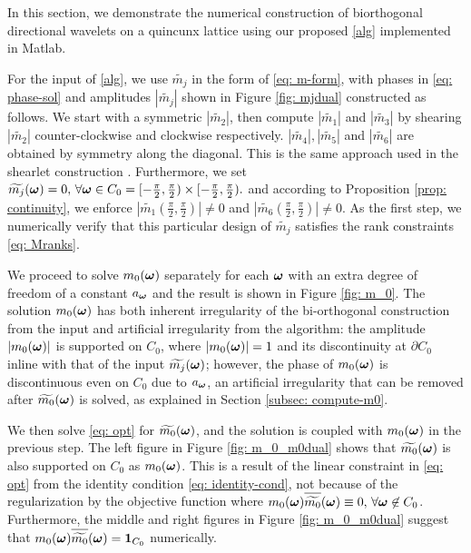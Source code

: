 In this section, we demonstrate the numerical construction of biorthogonal directional wavelets on a quincunx lattice using our proposed \ref{alg} implemented in Matlab.

For the input of \ref{alg}, we use $\widetilde{m_j}$ in the form of \eqref{eq: m-form}, with phases in \eqref{eq: phase-sol} and amplitudes $|\widetilde{m_j}|$ shown in Figure \ref{fig: mjdual} constructed as follows. We start with a symmetric $|\widetilde{m_2}|$, then compute $|\widetilde{m_1}|$ and $|\widetilde{m_3}|$ by shearing $|\widetilde{m_2}|$ counter-clockwise and clockwise respectively. $|\widetilde{m_4}|, |\widetilde{m_5}|$ and $|\widetilde{m_6}|$ are obtained by symmetry along the diagonal. This is the same approach used in the shearlet construction \cite{kutyniok2012digital}. Furthermore, we set $\widetilde{m_{j}}(\boldsymbol{\omega}) = 0,\,\forall \boldsymbol{\omega}\in C_0 = [-\frac{\pi}{2},\frac{\pi}{2})\times [-\frac{\pi}{2},\frac{\pi}{2}).$ and according to Proposition \ref{prop: continuity}, we enforce $|\widetilde{m_1}(\frac{\pi}{2},\frac{\pi}{2})|\neq 0$ and $|\widetilde{m_6}(\frac{\pi}{2},\frac{\pi}{2})|\neq 0$. As the first step, we numerically verify that this particular design of $\widetilde{m_j}$ satisfies the rank constraints \eqref{eq: Mranks}. 

We proceed to solve $m_0(\boldsymbol{\omega})$ separately for each $\boldsymbol{\omega}$ with an extra degree of freedom of a constant $a_{\boldsymbol{\omega}}$ and the result is shown in Figure \ref{fig: m_0}. The solution $m_0(\boldsymbol{\omega})$ has both inherent irregularity of the bi-orthogonal construction from the input and artificial irregularity from the algorithm: the amplitude $|m_0(\boldsymbol{\omega})|$ is supported on $C_0$, where $|m_0(\boldsymbol{\omega})| = 1$ and its discontinuity at $\partial C_0$ inline with that of the input $\widetilde{m_{j}}(\boldsymbol{\omega})$; however, the phase of $m_0(\boldsymbol{\omega})$ is discontinuous even on $C_0$ due to $a_{\boldsymbol{\omega}}$, an artificial irregularity that can be removed after $\widetilde{m_{0}}(\boldsymbol{\omega})$ is solved, as explained in Section \ref{subsec: compute-m0}.

We then solve \eqref{eq: opt} for $\widetilde{m_{0}}(\boldsymbol{\omega})$, and the solution is coupled with $m_0(\boldsymbol{\omega})$ in the previous step. The left figure in Figure \ref{fig: m_0_m0dual} shows that $\widetilde{m_{0}}(\boldsymbol{\omega})$ is also supported on $C_0$ as $m_0(\boldsymbol{\omega})$. This is a result of the linear constraint in \eqref{eq: opt} from the identity condition \eqref{eq: identity-cond}, not because of the regularization by the objective function where $m_0(\V{\omega})\sbarm{0}\equiv 0,\, \forall\V{\omega}\not\in C_0$. Furthermore, the middle and right figures in Figure \ref{fig: m_0_m0dual} suggest that $m_0(\V{\omega})\sbarm{0}=\V{1}_{C_0}$ numerically.

